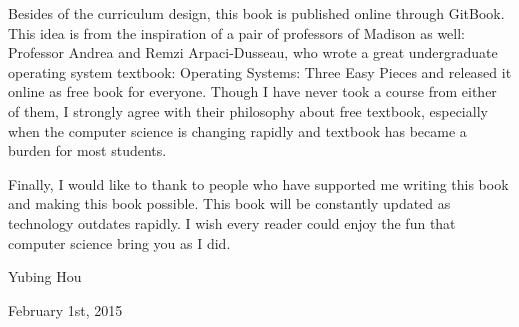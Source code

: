 \documentclass[../main.tex]{subfiles}
\begin{document}
    \par Besides of the curriculum design, this book is published online through GitBook.
    This idea is from the inspiration of a pair of professors of Madison as well:
    Professor Andrea and Remzi Arpaci-Dusseau, who wrote a great undergraduate
    operating system textbook: Operating Systems: Three Easy Pieces
    and released it online as free book for everyone. Though I have never took a
    course from either of them, I strongly agree with their philosophy about free
    textbook, especially when the computer science is changing rapidly and textbook
    has became a burden for most students.

    \par Finally, I would like to thank to people who have supported me writing this book
    and making this book possible. This book will be constantly updated as
    technology outdates rapidly. I wish every reader could enjoy the fun that
    computer science bring you as I did.

    \par Yubing Hou
    \par February 1st, 2015
\end{document}
